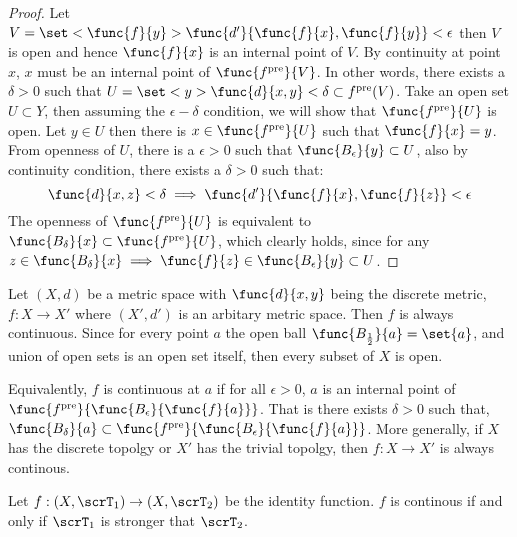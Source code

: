 \begin{proof}
    Let \(V = \set< \func{f}{y} >{\func{d'}{\func{f}{x},\func{f}{y}} < \epsilon}\) then \(V\) is open and hence \(\func{f}{x}\) is an internal point of \(V\). By continuity at point \(x\), \(x\) must be an internal point of \(\func{f^{\mathrm{pre}}}{V}\). In other words, there exists a \(\delta > 0\) such that \(U = \set<y>{\func{d}{x,y} < \delta } \subset f^{\mathrm{pre}}(V)\).
    Take an open set \(U \subset Y\), then assuming the \(\epsilon-\delta\) condition, we will show that \(\func{f^{\mathrm{pre}}}{U}\) is open. Let \(y \in U\) then there is \(x \in \func{f^{\mathrm{pre}}}{U}\) such that \(\func{f}{x} = y\). From openness of \(U\), there is a \( \epsilon > 0\) such that \(\func{B_\epsilon}{y} \subset U\), also by continuity condition, there exists a \(\delta > 0 \) such that:
    \begin{equation*}
        \func{d}{x,z} < \delta \implies \func{d'}{\func{f}{x},\func{f}{z}} < \epsilon
    \end{equation*}
    The openness of \(\func{f^{\mathrm{pre}}}{U}\) is equivalent to \(\func{B_\delta}{x} \subset \func{f^{\mathrm{pre}}}{U}\), which clearly holds, since for any \(z \in \func{B_\delta}{x} \implies \func{f}{z} \in \func{B_\epsilon}{y} \subset U\).
\end{proof}

\begin{example}
    Let \((X,d)\) be a metric space with \(\func{d}{x,y}\) being the discrete metric, \(f : X \to X'\) where \((X',d')\) is an arbitary metric space. Then \(f\) is always continuous. Since for every point \(a\) the open ball \(\func{B_{\frac{1}{2}}}{a} = \set{ a }\), and union of open sets is an open set itself, then every subset of \(X\) is open.
\end{example}
Equivalently, \(f\) is continuous at \(a\) if for all \(\epsilon > 0\), \(a\) is an internal point of \(\func{f^{\mathrm{pre}}}{\func{B_\epsilon}{\func{f}{a}}}\). That is there exists \(\delta > 0\) such that, \(\func{B_\delta}{a}  \subset \func{f^{\mathrm{pre}}}{\func{B_\epsilon}{\func{f}{a}}}\). More generally, if \(X\) has the discrete topolgy or \(X'\) has the trivial topolgy, then \(f:X\to X'\) is always continous.

\begin{proposition}
    Let \(f: (X,\scrT_1) \to (X,\scrT_2)\) be the identity function. \(f\) is continous if and only if \(\scrT_1\) is stronger that \(\scrT_2\).
\end{proposition}

